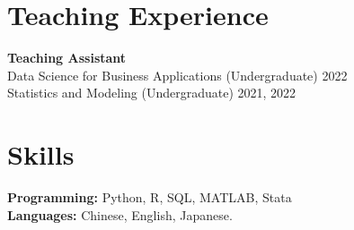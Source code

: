 \documentclass[10.5pt,letterpaper]{article}
\begin{document}
\section*{Teaching Experience}
\textbf{Teaching Assistant}\\[3pt]
Data Science for Business Applications (Undergraduate) \hfill 2022\\[3pt]
Statistics and Modeling (Undergraduate) \hfill 2021, 2022
\section*{Skills}
\textbf{Programming:} Python, R, SQL, MATLAB, Stata\\[3pt]
\textbf{Languages:} Chinese, English, Japanese.
\end{document}
